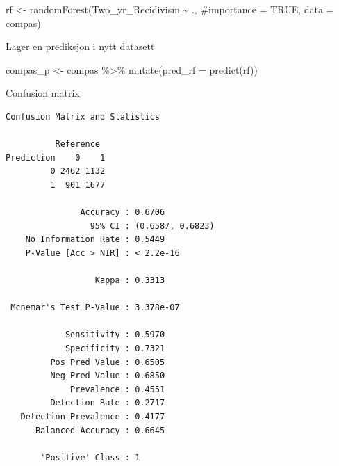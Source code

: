 \documentclass[
  letterpaper,
  DIV=11,
  numbers=noendperiod]{scrreprt}
\newenvironment{Shaded}{\begin{snugshade}}{\end{snugshade}}
\newcommand{\AttributeTok}[1]{\textcolor[rgb]{0.40,0.45,0.13}{#1}}
\newcommand{\CommentTok}[1]{\textcolor[rgb]{0.37,0.37,0.37}{#1}}
\newcommand{\FunctionTok}[1]{\textcolor[rgb]{0.28,0.35,0.67}{#1}}
\newcommand{\NormalTok}[1]{\textcolor[rgb]{0.00,0.23,0.31}{#1}}
\newcommand{\OtherTok}[1]{\textcolor[rgb]{0.00,0.23,0.31}{#1}}
\newcommand{\SpecialCharTok}[1]{\textcolor[rgb]{0.37,0.37,0.37}{#1}}
\newcommand{\StringTok}[1]{\textcolor[rgb]{0.13,0.47,0.30}{#1}}
\theoremstyle{definition}
\theoremstyle{remark}
\begin{document}
\begin{Shaded}
\begin{Highlighting}[]
\NormalTok{rf }\OtherTok{\textless{}{-}} \FunctionTok{randomForest}\NormalTok{(Two\_yr\_Recidivism }\SpecialCharTok{\textasciitilde{}}\NormalTok{ .,}
                   \CommentTok{\#importance = TRUE,}
                    \AttributeTok{data =}\NormalTok{ compas)}
\end{Highlighting}
\end{Shaded}

Lager en prediksjon i nytt datasett

\begin{Shaded}
\begin{Highlighting}[]
\NormalTok{compas\_p }\OtherTok{\textless{}{-}}\NormalTok{ compas }\SpecialCharTok{\%\textgreater{}\%} 
  \FunctionTok{mutate}\NormalTok{(}\AttributeTok{pred\_rf =} \FunctionTok{predict}\NormalTok{(rf))  }
\end{Highlighting}
\end{Shaded}

Confusion matrix

\begin{Shaded}
\end{Shaded}

\begin{verbatim}
Confusion Matrix and Statistics

          Reference
Prediction    0    1
         0 2462 1132
         1  901 1677
                                          
               Accuracy : 0.6706          
                 95% CI : (0.6587, 0.6823)
    No Information Rate : 0.5449          
    P-Value [Acc > NIR] : < 2.2e-16       
                                          
                  Kappa : 0.3313          
                                          
 Mcnemar's Test P-Value : 3.378e-07       
                                          
            Sensitivity : 0.5970          
            Specificity : 0.7321          
         Pos Pred Value : 0.6505          
         Neg Pred Value : 0.6850          
             Prevalence : 0.4551          
         Detection Rate : 0.2717          
   Detection Prevalence : 0.4177          
      Balanced Accuracy : 0.6645          
                                          
       'Positive' Class : 1               
                                          
\end{verbatim}
\end{document}
